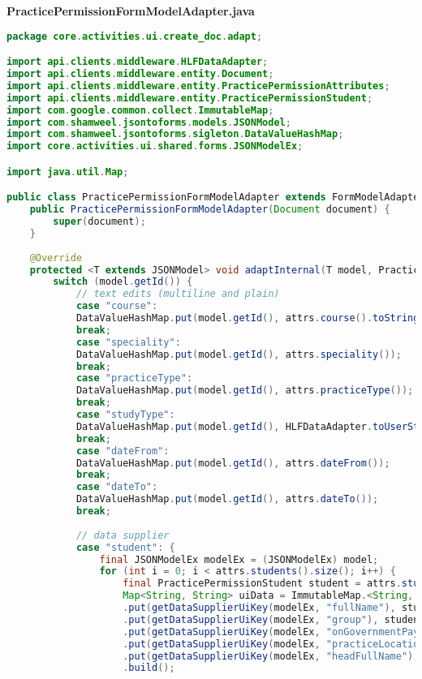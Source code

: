 \textbf{PracticePermissionFormModelAdapter.java}
\begin{lstlisting}[language=Java]
package core.activities.ui.create_doc.adapt;

import api.clients.middleware.HLFDataAdapter;
import api.clients.middleware.entity.Document;
import api.clients.middleware.entity.PracticePermissionAttributes;
import api.clients.middleware.entity.PracticePermissionStudent;
import com.google.common.collect.ImmutableMap;
import com.shamweel.jsontoforms.models.JSONModel;
import com.shamweel.jsontoforms.sigleton.DataValueHashMap;
import core.activities.ui.shared.forms.JSONModelEx;

import java.util.Map;

public class PracticePermissionFormModelAdapter extends FormModelAdapter<PracticePermissionAttributes> {
	public PracticePermissionFormModelAdapter(Document document) {
		super(document);
	}
	
	@Override
	protected <T extends JSONModel> void adaptInternal(T model, PracticePermissionAttributes attrs) {
		switch (model.getId()) {
			// text edits (multiline and plain)
			case "course":
			DataValueHashMap.put(model.getId(), attrs.course().toString());
			break;
			case "speciality":
			DataValueHashMap.put(model.getId(), attrs.speciality());
			break;
			case "practiceType":
			DataValueHashMap.put(model.getId(), attrs.practiceType());
			break;
			case "studyType":
			DataValueHashMap.put(model.getId(), HLFDataAdapter.toUserStudyType(attrs.studyType()));
			break;
			case "dateFrom":
			DataValueHashMap.put(model.getId(), attrs.dateFrom());
			break;
			case "dateTo":
			DataValueHashMap.put(model.getId(), attrs.dateTo());
			break;
			
			// data supplier
			case "student": {
				final JSONModelEx modelEx = (JSONModelEx) model;
				for (int i = 0; i < attrs.students().size(); i++) {
					final PracticePermissionStudent student = attrs.students().get(i);
					Map<String, String> uiData = ImmutableMap.<String, String>builder()
					.put(getDataSupplierUiKey(modelEx, "fullName"), student.getCommonInfo().getFullName())
					.put(getDataSupplierUiKey(modelEx, "group"), student.getCommonInfo().getGroup())
					.put(getDataSupplierUiKey(modelEx, "onGovernmentPay"), HLFDataAdapter.toUserOnGovernmentPay(student.getCommonInfo().getOnGovernmentPay()))
					.put(getDataSupplierUiKey(modelEx, "practiceLocation"), student.getPracticeLocation())
					.put(getDataSupplierUiKey(modelEx, "headFullName"), student.getHeadFullName())
					.build();
					

\end{lstlisting}

